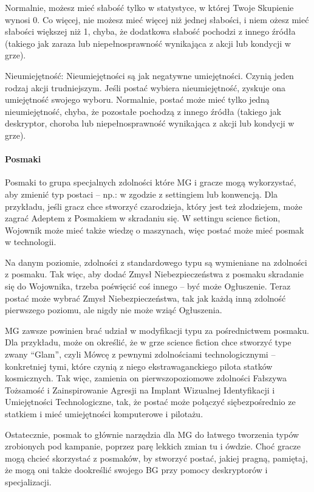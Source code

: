 Normalnie, możesz mieć słabość tylko w statystyce, w której Twoje Skupienie wynosi 0. Co więcej, nie możesz mieć więcej niż jednej słabości, i niem ożesz mieć słabości większej niż 1, chyba, że dodatkowa słabość pochodzi z innego źródła (takiego jak zaraza lub niepełnosprawność wynikająca z akcji lub kondycji w grze).

Nieumiejętność: Nieumiejętności są jak negatywne umiejętności. Czynią jeden rodzaj akcji trudniejszym. Jeśli postać wybiera nieumiejętność, zyskuje ona umiejętność swojego wyboru. Normalnie, postać może mieć tylko jedną nieumiejętność, chyba, że pozostałe pochodzą z innego źródła (takiego jak deskryptor, choroba lub niepełnosprawność wynikająca z akcji lub kondycji w grze).

\paragraph{Posmaki}

Posmaki to grupa specjalnych zdolności które MG i gracze mogą wykorzystać, aby zmienić typ postaci – np.: w zgodzie z settingiem lub konwencją. Dla przykładu, jeśli gracz chce stworzyć czarodzieja, który jest też złodziejem, może zagrać Adeptem z Posmakiem w skradaniu się. W settingu science fiction, Wojownik może mieć także wiedzę o maszynach, więc postać może mieć posmak w technologii. 

Na danym poziomie, zdolności z standardowego typu są wymieniane na zdolności z posmaku. Tak więc, aby dodać Zmysł Niebezpieczeństwa z posmaku skradanie się do Wojownika, trzeba poświęcić coś innego – być może Ogłuszenie. Teraz postać może wybrać Zmysł Niebezpieczeństwa, tak jak każdą inną zdolność pierwszego poziomu, ale nigdy nie może wziąć Ogłuszenia.

MG zawsze powinien brać udział w modyfikacji typu za pośrednictwem posmaku. Dla przykładu, może on określić, że w grze science fiction chce stworzyć type zwany “Glam”, czyli Mówcę z pewnymi zdolnościami technologicznymi – konkretniej tymi, które czynią z niego ekstrawaganckiego pilota statków kosmicznych. Tak więc, zamienia on pierwszopoziomowe zdolności Fałszywa Tożsamość i Zainspirowanie Agresji na Implant Wizualnej Identyfikacji i Umiejętności Technologiczne, tak, że postać może połączyć siębezpośrednio ze statkiem i mieć umiejętności komputerowe i pilotażu.

Ostatecznie, posmak to głównie narzędzia dla MG do łatwego tworzenia typów zrobionych pod kampanie, poprzez parę lekkich zmian tu i ówdzie. Choć gracze mogą chcieć skorzystać z posmaków, by stworzyć postać, jakiej pragną, pamiętaj, że mogą oni także dookreślić swojego BG przy pomocy deskryptorów i specjalizacji. 


